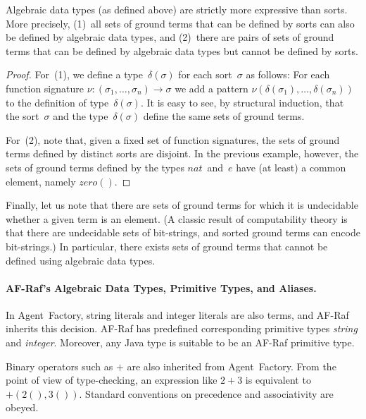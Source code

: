 \documentclass[a4paper,12pt,oneside,fleqn]{book} %
\newcommand{\rg}[1]{\marginpar{\tiny\raggedright\textcolor{blue}{\bf rg:} #1}}
\renewcommand{\rg}{}
\begin{document}
{\begin{proposition}
Algebraic data types (as defined above) are strictly more expressive than
sorts. More precisely, (1)~all sets of ground terms that can be defined by
sorts can also be defined by algebraic data types, and (2)~there are pairs
of sets of ground terms that can be defined by algebraic data types but
cannot be defined by sorts.
\end{proposition}

\begin{proof}
For~(1), we define a type~$\delta(\sigma)$ for each sort~$\sigma$ as
follows: For each function signature
$\nu:(\sigma_1,\ldots,\sigma_n)\to\sigma$ we add a pattern
$\nu(\delta(\sigma_1),\ldots,\delta(\sigma_n))$ to the definition of
type~$\delta(\sigma)$. It is easy to see, by structural induction, that the
sort~$\sigma$ and the type~$\delta(\sigma)$ define the same sets of ground
terms.

For~(2), note that, given a fixed set of function signatures, the sets of
ground terms defined by distinct sorts are disjoint. In the previous
example, however, the sets of ground terms defined by the types
$\mathit{nat}$~and~$e$ have (at least) a common element, namely
$\mathit{zero}()$.
\end{proof}

Finally, let us note that there are sets of ground terms for which it is
undecidable whether a given term is an element.  (A classic result of
computability theory is that there are undecidable sets of bit-strings, and
sorted ground terms can encode bit-strings.) In particular, there exists
sets of ground terms that cannot be defined using algebraic data types.


\paragraph{AF-Raf's Algebraic Data Types, Primitive Types, and Aliases.}
In Agent~Factory, string literals and integer literals are
also terms, and AF-Raf inherits this decision. AF-Raf has
predefined corresponding primitive types \textit{string} and
\textit{integer}. Moreover, any Java type is suitable to be an AF-Raf
primitive type.

Binary operators such as $+$ are also inherited from Agent~Factory. From
the point of view of type-checking, an expression like $2+3$ is equivalent
to $+(2(),3())$. Standard conventions on precedence and associativity are
obeyed.

}
\end{document}
